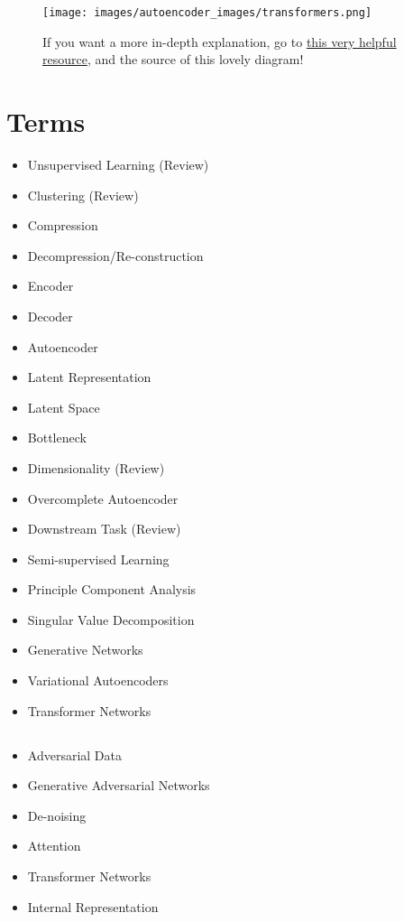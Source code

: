         \begin{figure}[H]
            \centering
            \texttt{[image: images/autoencoder\_images/transformers.png]}
            \caption*{If you want a more in-depth explanation, go to \href{https://lena-voita.github.io/nlp_course/seq2seq_and_attention.html}{this very helpful resource}, and the source of this lovely diagram!}
        \end{figure}
        

\section{Terms}

    \begin{itemize}
        \item Unsupervised Learning (Review)
        \item Clustering (Review)
        \item Compression
        \item Decompression/Re-construction
        \item Encoder
        \item Decoder 
        \item Autoencoder
        \item Latent Representation
        \item Latent Space
        \item Bottleneck
        \item Dimensionality (Review)
        \item Overcomplete Autoencoder
        \item Downstream Task (Review)
        \item Semi-supervised Learning 
        \item Principle Component Analysis
        \item Singular Value Decomposition
        \item Generative Networks
        \item Variational Autoencoders
        \item Transformer Networks
    \end{itemize}

    \subsection*{}

    \begin{itemize}
        \item Adversarial Data
        \item Generative Adversarial Networks
        \item De-noising
        \item Attention
        \item Transformer Networks
        \item Internal Representation
    \end{itemize}

        

        
